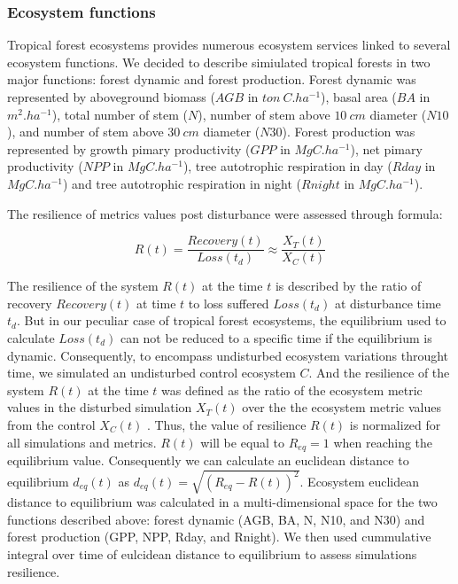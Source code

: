 \documentclass[12pt,]{article}
\theoremstyle{definition}
\theoremstyle{definition}
\theoremstyle{remark}
\begin{document}
\subsubsection{Ecosystem functions}\label{ecosystem-functions}

Tropical forest ecosystems provides numerous ecosystem services linked
to several ecosystem functions. We decided to describe simiulated
tropical forests in two major functions: forest dynamic and forest
production. Forest dynamic was represented by aboveground biomass
(\(AGB\) in \(ton~C.ha^{-1}\)), basal area (\(BA\) in \(m^2.ha^{-1}\)),
total number of stem (\(N\)), number of stem above \(10~cm\) diameter
(\(N10\)), and number of stem above \(30~cm\) diameter (\(N30\)). Forest
production was represented by growth pimary productivity (\(GPP\) in
\(MgC.ha^{-1}\)), net pimary productivity (\(NPP\) in \(MgC.ha^{-1}\)),
tree autotrophic respiration in day (\(Rday\) in \(MgC.ha^{-1}\)) and
tree autotrophic respiration in night (\(Rnight\) in \(MgC.ha^{-1}\)).

The resilience of metrics values post disturbance were assessed through
\citet{Henry2012} formula:

\begin{equation}
  R\left(t\right)=\frac{Recovery\left(t\right)}{Loss\left(t_d\right)} \approx \frac{X_T(t)}{X_C(t)}
  \label{eq:Resilience}
\end{equation}

The resilience of the system \(R(t)\) at the time \(t\) is described by
the ratio of recovery \(Recovery(t)\) at time \(t\) to loss suffered
\(Loss(t_d)\) at disturbance time \(t_d\). But in our peculiar case of
tropical forest ecosystems, the equilibrium used to calculate
\(Loss(t_d)\) can not be reduced to a specific time if the equilibrium
is dynamic. Consequently, to encompass undisturbed ecosystem variations
throught time, we simulated an undisturbed control ecosystem \(C\). And
the resilience of the system \(R(t)\) at the time \(t\) was defined as
the ratio of the ecosystem metric values in the disturbed simulation
\(X_T(t)\) over the the ecosystem metric values from the control
\(X_C(t)\) . Thus, the value of resilience \(R(t)\) is normalized for
all simulations and metrics. \(R(t)\) will be equal to \(R_{eq} = 1\)
when reaching the equilibrium value. Consequently we can calculate an
euclidean distance to equilibrium \(d_{eq}(t)\) as
\(d_{eq}(t) = \sqrt{(R_{eq} - R(t))^2}\). Ecosystem euclidean distance
to equilibrium was calculated in a multi-dimensional space for the two
functions described above: forest dynamic (AGB, BA, N, N10, and N30) and
forest production (GPP, NPP, Rday, and Rnight). We then used cummulative
integral over time of eulcidean distance to equilibrium to assess
simulations resilience.
\end{document}
